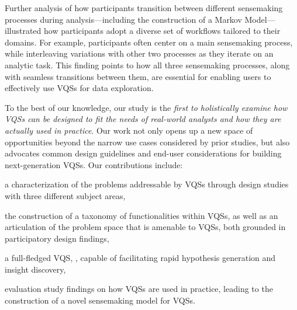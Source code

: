 \par Further analysis of how participants
transition between different sensemaking processes
during analysis---including the construction of a Markov Model---illustrated
how participants
adopt a diverse set of workflows tailored
to their domains. 
For example, participants
often center on a main sensemaking process,
while interleaving variations with other
two processes as they iterate on an analytic task.
This finding points to how all three sensemaking processes,
along with seamless transitions between them,
are essential for enabling users to effectively
use VQSs for data exploration. 

\par 
To the best of our knowledge, 
our study is the \emph{first to holistically 
examine how VQSs can be designed to fit the needs of real-world 
analysts and how they are actually used in practice}. 
Our work not only opens up a new space of 
opportunities beyond the narrow use cases 
considered by prior studies, but also advocates 
common design guidelines and end-user 
considerations for building next-generation VQSs.
Our contributions include: 
\begin{denselist}
\item a characterization of the problems addressable by VQSs through design studies with three different subject areas,
\item the construction of a taxonomy of functionalities within VQSs, as well as an articulation of the problem space that is amenable to VQSs, both grounded in participatory design findings,
\item a full-fledged VQS, \zvpp, capable of facilitating rapid hypothesis generation and insight discovery,
\item evaluation study findings on how VQSs are used in practice, leading to the construction of a novel sensemaking model for VQSs. %
\end{denselist}

